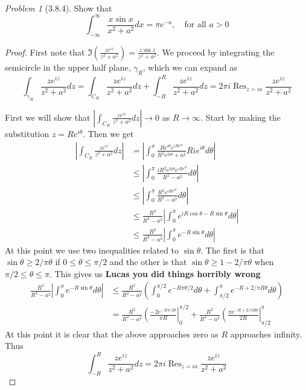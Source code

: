 \documentclass[10pt]{article}
\newcommand{\sk}{\vskip 10mm}
\DeclareMathOperator{\Res}{Res}
\theoremstyle{remark}
\newtheorem{problem}{Problem}
\theoremstyle{remark}
\begin{document}
\sk

\begin{problem}[3.8.4]
  Show that
  \[
    \int_{-\infty}^\infty\frac{x\sin x}{x^2+a^2}dx=\pi e^{-a},\quad \text{for all $a>0$}
  \]
\end{problem}

\begin{proof}
  First note that $\Im(\frac{ze^{iz}}{z^2+a^2})=\frac{z\sin z}{z^2+a^2}$. We proceed
  by integrating the semicircle in the upper half plane, $\gamma_R$, which we can
  expand as
  \[
    \int_{\gamma_R}\frac{ze^{iz}}{z^2+a^2}dz=\int_{C_R}\frac{ze^{iz}}{z^2+a^2}dz+\int_{-R}^R\frac{ze^{iz}}{z^2+a^2} dz = 2\pi i\Res_{z=ia}\frac{ze^{iz}}{z^2+a^2}
  \]

  First we will show that $\left|\int_{C_R}\frac{ze^{iz}}{z^2+a^2}dz\right|\rightarrow 0$ as $R\rightarrow\infty$. Start by
  making the substitution $z=Re^{i\theta}$. Then we get
  \begin{align*}
    \left|\int_{C_R}\frac{ze^{iz}}{z^2+a^2}dz\right| &= \left|\int_0^\pi\frac{Re^{i\theta}e^{iRe^{i\theta}}}{R^2e^{2i\theta}+a^2}Rie^{i\theta}d\theta\right|\\
                                                  &\leq \left|\int_0^\pi\frac{iR^2e^{2i\theta}e^{iRe^{i\theta}}}{R^2-a^2}d\theta\right|\\
                                                  &\leq\left|\int_0^\pi\frac{R^2e^{iRe^{i\theta}}}{R^2-a^2}d\theta\right|\\
                                                  &\leq\frac{R^2}{R^2-a^2}\left|\int_0^\pi e^{iR\cos\theta-R\sin\theta}d\theta\right|\\
                                                  &\le\frac{R^2}{R^2-a^2}\left|\int_0^\pi e^{-R\sin\theta}d\theta\right|
  \end{align*}
  At this point we use two inequalities related to $\sin\theta$. The first
  is that $\sin\theta\geq 2/\pi\theta$ if $0\leq\theta\leq\pi/2$ and the other is that
  $\sin\theta\geq 1-2/\pi\theta$ when $\pi/2\leq\theta\leq\pi$. This gives us \textbf{Lucas you did things horribly wrong}
  \begin{align*}
    \frac{R^2}{R^2-a^2}\left|\int_0^\pi e^{-R\sin\theta}d\theta\right| &\leq\frac{R^2}{R^2-a^2}\left(\int_0^{\pi/2}e^{-R\pi\theta/2}d\theta+\int_{\pi/2}^{\pi}e^{-R+2/\pi R\theta}d\theta\right)\\
                                                               &=\frac{R^2}{R^2-a^2}\left(\frac{-2e^{-R\pi/2\theta}}{\pi R}\right|_0^{\pi/2}+\frac{R^2}{R^2-a^2}\left(\frac{\pi e^{-R+2/\pi R\theta}}{2R}\right|_{\pi/2}^\pi
  \end{align*}%
  At this point it is clear that the above approaches zero as $R$ approaches infinity.
  Thus
  \[
    \int_{-R}^R \frac{ze^{iz}}{z^2+a^2}dz = 2\pi i\Res_{z=ia}\frac{ze^{iz}}{z^2+a^2}
  \]


\end{proof}
\end{document}
